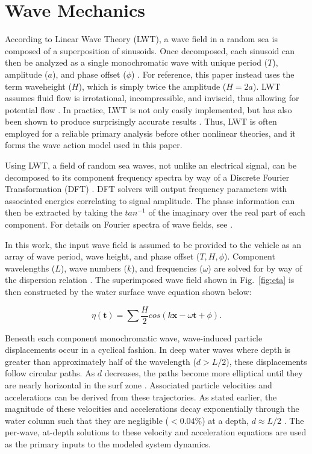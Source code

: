 \documentclass[letterpaper, 10 pt, conferences]{IEEEconf}  %
\renewcommand{\vec}[1]{\mathbf{#1}}
\begin{document}
\section{Wave Mechanics} 
\label{sec:waves}

According to Linear Wave Theory (LWT), a wave field in a random sea is composed of a superposition of sinusoids. Once decomposed, each sinusoid can then be analyzed as a single monochromatic wave with unique period ($T$), amplitude ($a$), and phase offset ($\phi$) \cite{phillips,D&D}. For reference, this paper instead uses the term waveheight ($H$), which is simply twice the amplitude ($H = 2a$). LWT assumes fluid flow is irrotational, incompressible, and inviscid, thus allowing for potential flow \cite{bosma}. In practice, LWT is not only easily implemented, but has also been shown to produce surprisingly accurate results \cite{D&D}. Thus, LWT is often employed for a reliable primary analysis before other nonlinear theories, and it forms the wave action model used in this paper.

Using LWT, a field of random sea waves, not unlike an electrical signal, can be decomposed to its component frequency spectra by way of a Discrete Fourier Transformation (DFT) \cite{goda}. DFT solvers will output frequency parameters with associated energies correlating to signal amplitude. The phase information can then be extracted by taking the $tan^{-1}$ of the imaginary over the real part of each component. For details on Fourier spectra of wave fields, see \cite{falnes}. 

In this work, the input wave field is assumed to be provided to the vehicle as an array of wave period, wave height, and phase offset ($T, H, \phi$). Component wavelengths ($L$), wave numbers ($k$), and frequencies ($\omega$) are solved for by way of the dispersion relation \cite{D&D}. The superimposed wave field shown in Fig.~\ref{fig:eta} is then constructed by the water surface wave equation shown below: 
 
\begin{equation} 
\eta(\vec{t}) = \sum \frac{H}{2}cos(k\vec{x}-\omega\vec{t}+\phi) .
\label{eqn:eta}
\end{equation}

Beneath each component monochromatic wave, wave-induced particle displacements occur in a cyclical fashion. In deep water waves where depth is greater than approximately half of the wavelength ($d > L/2$), these displacements follow circular paths. As $d$ decreases, the paths become more elliptical until they are nearly horizontal in the surf zone \cite{D&D}. Associated particle velocities and accelerations can be derived from these trajectories. As stated earlier, the magnitude of these velocities and accelerations decay exponentially through the water column such that they are negligible ($< 0.04\%$) at a depth, $d \approx L/2$ \cite{D&D}. The per-wave, at-depth solutions to these velocity and acceleration equations are used as the primary inputs to the modeled system dynamics.
\end{document}
